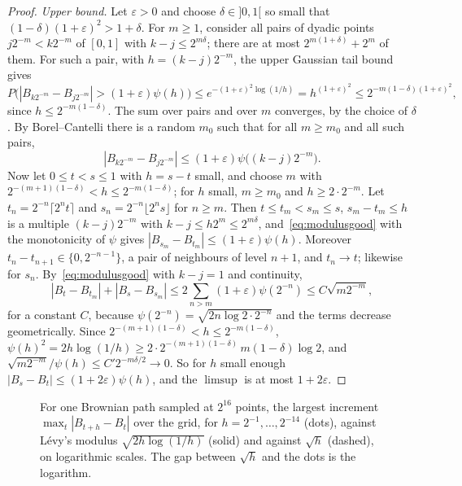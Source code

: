 \begin{proof}
\emph{Upper bound.} Let $\varepsilon>0$ and choose $\delta\in]0,1[$ so small that $(1-\delta)(1+\varepsilon)^2>1+\delta$. For $m\ge1$, consider all pairs of dyadic points $j2^{-m}<k2^{-m}$ of $[0,1]$ with
$k-j\le2^{m\delta}$; there are at most $2^{m(1+\delta)}+2^m$ of them. For such a pair, with $h=(k-j)2^{-m}$, the upper Gaussian tail bound gives
\[
P\bigl(|B_{k2^{-m}}-B_{j2^{-m}}|>(1+\varepsilon)\psi(h)\bigr)\le e^{-(1+\varepsilon)^2\log(1/h)}=h^{(1+\varepsilon)^2}\le2^{-m(1-\delta)(1+\varepsilon)^2},
\]
since $h\le2^{-m(1-\delta)}$. The sum over pairs and over $m$ converges, by the choice of $\delta$. By Borel--Cantelli there is a random $m_0$ such that for all $m\ge m_0$ and all such pairs,
\begin{equation}\label{eq:modulusgood}
|B_{k2^{-m}}-B_{j2^{-m}}|\le(1+\varepsilon)\psi\bigl((k-j)2^{-m}\bigr).
\end{equation}
Now let $0\le t<s\le1$ with $h=s-t$ small, and choose $m$ with $2^{-(m+1)(1-\delta)}<h\le2^{-m(1-\delta)}$; for $h$ small, $m\ge m_0$ and $h\ge2\cdot2^{-m}$. Let $t_n=2^{-n}\lceil2^nt\rceil$ and $s_n=2^{-n}\lfloor2^ns\rfloor$
for $n\ge m$. Then $t\le t_m<s_m\le s$, $s_m-t_m\le h$ is a multiple $(k-j)2^{-m}$ with $k-j\le h2^m\le2^{m\delta}$, and~\eqref{eq:modulusgood} with the monotonicity of $\psi$ gives
$|B_{s_m}-B_{t_m}|\le(1+\varepsilon)\psi(h)$. Moreover $t_n-t_{n+1}\in\{0,2^{-n-1}\}$, a pair of neighbours of level $n+1$, and $t_n\to t$; likewise for $s_n$. By~\eqref{eq:modulusgood} with $k-j=1$ and continuity,
\[
|B_t-B_{t_m}|+|B_s-B_{s_m}|\le2\sum_{n>m}(1+\varepsilon)\psi(2^{-n})\le C\sqrt{m2^{-m}},
\]
for a constant $C$, because $\psi(2^{-n})=\sqrt{2n\log2\cdot2^{-n}}$ and the terms decrease geometrically. Since $2^{-(m+1)(1-\delta)}<h\le2^{-m(1-\delta)}$, $\psi(h)^2=2h\log(1/h)\ge2\cdot2^{-(m+1)(1-\delta)}\,m(1-\delta)\log2$, and
$\sqrt{m2^{-m}}/\psi(h)\le C'2^{-m\delta/2}\to0$. So for $h$ small enough $|B_s-B_t|\le(1+2\varepsilon)\psi(h)$, and the $\limsup$ is at most $1+2\varepsilon$.
\end{proof}

\begin{figure}[ht]
\centering
{}
\caption{For one Brownian path sampled at $2^{16}$ points, the largest increment $\max_t|B_{t+h}-B_t|$ over the grid, for $h=2^{-1},\dots,2^{-14}$ (dots), against L\'evy's modulus
$\sqrt{2h\log(1/h)}$ (solid) and against $\sqrt h$ (dashed), on logarithmic scales. The gap between $\sqrt h$ and the dots is the logarithm.}
\label{fig:modulus}
\end{figure}

